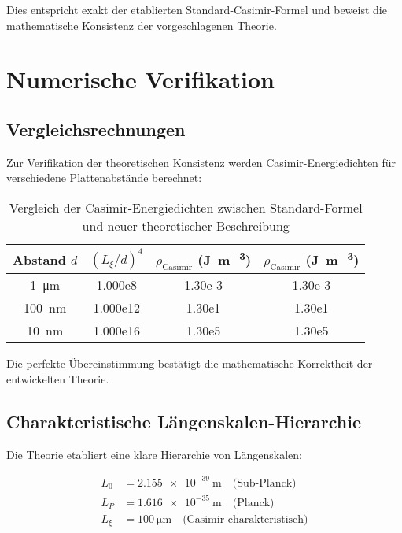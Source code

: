 \documentclass[12pt,a4paper]{article}
\begin{document}
	Dies entspricht exakt der etablierten Standard-Casimir-Formel und beweist die mathematische Konsistenz der vorgeschlagenen Theorie.
	
	\section{Numerische Verifikation}
	
	\subsection{Vergleichsrechnungen}
	
	Zur Verifikation der theoretischen Konsistenz werden Casimir-Energiedichten für verschiedene Plattenabstände berechnet:
	
	\begin{table}[H]
		\centering
		\begin{tabular}{c S[table-format=1.3e1] S[table-format=1.2e-2] S[table-format=1.2e-2]}
			\toprule
			Abstand \( d \) & {\((L_\xi/d)^4\)} & {\(\rho_{\text{Casimir}}\) (\unit{\joule\per\meter\cubed})} & {\(\rho_{\text{Casimir}}\) (\unit{\joule\per\meter\cubed})} \\
			\midrule
			\SI{1}{\micro\meter} & 1.000e8 & 1.30e-3 & 1.30e-3 \\
			\SI{100}{\nano\meter} & 1.000e12 & 1.30e1 & 1.30e1 \\
			\SI{10}{\nano\meter} & 1.000e16 & 1.30e5 & 1.30e5 \\
			\bottomrule
		\end{tabular}
		\caption{Vergleich der Casimir-Energiedichten zwischen Standard-Formel und neuer theoretischer Beschreibung}
		\label{tab:casimir_comparison}
	\end{table}
	
	Die perfekte Übereinstimmung bestätigt die mathematische Korrektheit der entwickelten Theorie.
	
	\subsection{Charakteristische Längenskalen-Hierarchie}
	
	Die Theorie etabliert eine klare Hierarchie von Längenskalen:
	
	\begin{align}
		L_0 &= \SI{2.155e-39}{\meter} \quad \text{(Sub-Planck)} \label{eq:L0_value}\\
		L_P &= \SI{1.616e-35}{\meter} \quad \text{(Planck)} \label{eq:LP_value}\\
		L_\xi &= \SI{100}{\micro\meter} \quad \text{(Casimir-charakteristisch)} \label{eq:Lxi_value}
	\end{align}
	
\end{document}
